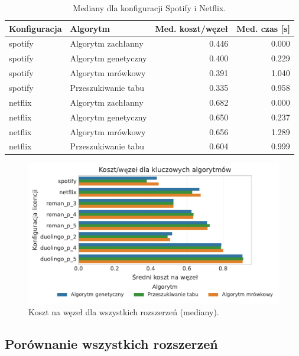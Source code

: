 \begin{table}[H]
    \centering
    \caption{Mediany dla konfiguracji Spotify i Netflix.}
    \label{tab:ext-additional-static}
    \begin{tabular}{llrr}
        \toprule
        \textbf{Konfiguracja} & \textbf{Algorytm}   & \textbf{Med. koszt/węzeł} & \textbf{Med. czas [s]} \\
        \midrule
        spotify               & Algorytm zachłanny  & 0.446                     & 0.000                  \\
        spotify               & Algorytm genetyczny & 0.400                     & 0.229                  \\
        spotify               & Algorytm mrówkowy   & 0.391                     & 1.040                  \\
        spotify               & Przeszukiwanie tabu & 0.335                     & 0.958                  \\
        netflix               & Algorytm zachłanny  & 0.682                     & 0.000                  \\
        netflix               & Algorytm genetyczny & 0.650                     & 0.237                  \\
        netflix               & Algorytm mrówkowy   & 0.656                     & 1.289                  \\
        netflix               & Przeszukiwanie tabu & 0.604                     & 0.999                  \\
    \end{tabular}
\end{table}

\begin{figure}[H]
    \centering
    \includegraphics[width=0.6\linewidth]{assets/figures/extensions/static/cost_per_node_by_license_targets.pdf}
    \caption{Koszt na węzeł dla wszystkich rozszerzeń (mediany).}
    \label{fig:ext-license-cost}
\end{figure}


\subsection{Porównanie wszystkich rozszerzeń}

